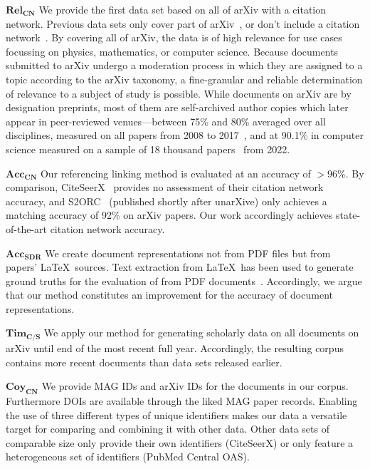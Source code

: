 $\mathbf{Rel_{CN}}$ We provide the first data set based on all of arXiv with a citation network. Previous data sets only cover part of arXiv~\cite{Faerber2018LREC}, or don't include a citation network~\cite{arXMLiv}. By covering all of arXiv, the data is of high relevance for use cases focussing on physics, mathematics, or computer science. Because documents submitted to arXiv undergo a moderation process in which they are assigned to a topic according to the arXiv taxonomy, a fine-granular and reliable determination of relevance to a subject of study is possible. While documents on arXiv are by designation preprints, most of them are self-archived author copies which later appear in peer-reviewed venues---between 75\% and 80\% averaged over all disciplines, measured on all papers from 2008 to 2017~\cite{Lin2020}, and at 90.1\% in computer science measured on a sample of 18 thousand papers~\cite{Bagchi2024} from 2022.

$\mathbf{Acc_{CN}}$ Our referencing linking method is evaluated at an accuracy of $>96$\%. By comparison, CiteSeerX~\cite{Wu2015,Wu2016,Patel2021} provides no assessment of their citation network accuracy, and S2ORC~\cite{Lo2020} (published shortly after unarXive) only achieves a matching accuracy of 92\% on arXiv papers. Our work accordingly achieves state-of-the-art citation network accuracy.

$\mathbf{Acc_{SDR}}$ We create document representations not from PDF files but from papers' \LaTeX\ sources. Text extraction from \LaTeX\ has been used to generate ground truths for the evaluation of from PDF documents~\cite{Bast2017}. Accordingly, we argue that our method constitutes an improvement for the accuracy of document representations.

$\mathbf{Tim_{C/S}}$ We apply our method for generating scholarly data on all documents on arXiv until end of the most recent full year. Accordingly, the resulting corpus contains more recent documents than data sets released earlier.

$\mathbf{Coy_{CN}}$ We provide MAG IDs and arXiv IDs for the documents in our corpus. Furthermore DOIs are available through the liked MAG paper records. Enabling the use of three different types of unique identifiers makes our data a versatile target for comparing and combining it with other data. Other data sets of comparable size only provide their own identifiers (CiteSeerX) or only feature a heterogeneous set of identifiers (PubMed Central OAS). \\

